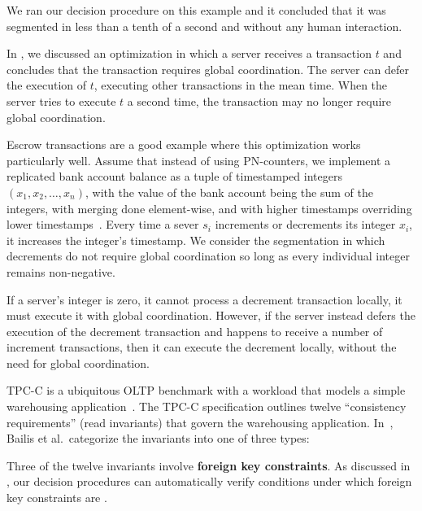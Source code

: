 We ran our decision procedure on this example and it concluded that it was
segmented \invariantconfluent{} in less than a tenth of a second and without
any human interaction.

\begin{revisions}
  In , we discussed an optimization in which a
  server receives a transaction $t$ and concludes that the transaction requires
  global coordination. The server can defer the execution of $t$,
  executing other transactions in the mean time. When the server tries to
  execute $t$ a second time, the transaction may no longer require global
  coordination.

  Escrow transactions are a good example where this optimization works
  particularly well. Assume that instead of using PN-counters, we implement a
  replicated bank account balance as a tuple of timestamped integers $(x_1,
  x_2, \ldots, x_n)$, with the value of the bank account being the sum of the
  integers, with merging done element-wise, and with higher timestamps
  overriding lower timestamps~\cite{wu2019anna}. Every time a sever $s_i$
  increments or decrements its integer $x_i$, it increases the integer's
  timestamp. We consider the segmentation in which decrements do not require
  global coordination so long as every individual integer remains non-negative.

  If a server's integer is zero, it cannot process a decrement transaction
  locally, it must execute it with global coordination. However, if the server
  instead defers the execution of the decrement transaction and happens to
  receive a number of increment transactions, then it can execute the decrement
  locally, without the need for global coordination.
\end{revisions}

\example[TPC-C]
TPC-C is a ubiquitous OLTP benchmark with a workload that models a simple
warehousing application~\cite{difallah2013oltp}. The TPC-C specification
outlines twelve ``consistency requirements'' (read invariants) that govern the
warehousing application. In~\cite{bailis2014coordination}, Bailis et al.\
categorize the invariants into one of three types:

    Three of the twelve invariants involve \textbf{foreign key constraints}.  As
    discussed in \exampleref{ForeignKeysEval}, our decision procedures can
    automatically verify conditions under which foreign key constraints are
    \invariantconfluent{}.

